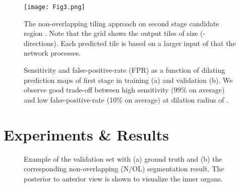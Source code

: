\documentclass[authoryear]{elsarticle}
\begin{document}
\begin{figure}[htb] \centering
	\texttt{[image: Fig3.png]}
	\caption{The non-overlapping tiling approach on second stage candidate region . Note that the grid shows the output tiles of size  (-directions). Each predicted tile is based on a larger input of  that the network processes.}
	\label{fig:tiling}
\end{figure}
\begin{figure}[htb]
	\centering
\hfill
	\caption{Sensitivity and false-positive-rate (FPR) as a function of dilating prediction maps of first stage in training (a) and validation (b). We observe good trade-off between high sensitivity (99\% on average) and low false-positive-rate (10\% on average) at dilation radius of .}
	\label{fig:recall_stage1}
\end{figure}
\section{Experiments \& Results}
\begin{figure}[htb] \centering
	\hspace{5em}
	\caption{Example of the validation set with (a) ground truth and (b) the corresponding non-overlapping (N/OL) segmentation result. The posterior to anterior view is shown to visualize the inner organs.}
	\label{fig:prediction_rendering}
\end{figure}
\end{document}

